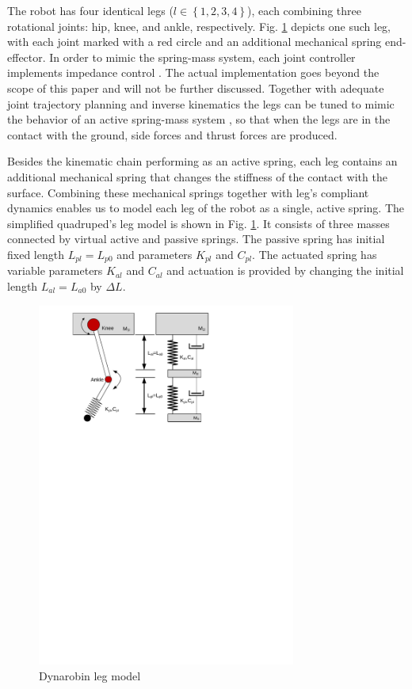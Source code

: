 

The robot has four identical legs ($l\in \left \{ 1,2,3,4 \right \}$), each combining three rotational joints: hip, knee, and ankle, respectively. Fig. \ref{fig:DynarobinLEG} depicts one such leg, with each joint marked with a red circle and an additional mechanical spring end-effector. In order to mimic the spring-mass system, each joint controller implements impedance control \cite{citeulike:2203614}. The actual implementation goes beyond the scope of this paper and will not be further discussed. Together with adequate joint trajectory planning and inverse kinematics the legs can be tuned to mimic the behavior of an active spring-mass system \cite{conf/iros/ParkP12}\cite{6171868}, so that when the legs are in the contact with the ground, side forces and thrust forces are produced.

Besides the kinematic chain performing as an active spring, each leg contains an additional mechanical spring that changes the stiffness of the contact with the surface. Combining these mechanical springs together with leg's compliant dynamics enables us to model each leg of the robot as a single, active spring. The simplified quadruped's leg model is shown in Fig. \ref{fig:DynarobinLEG}. It consists of three masses connected by virtual active and passive springs. The passive spring has initial fixed length $L_{pl}=L_{p0}$ and parameters $K_{pl}$ and $C_{pl}$.  The actuated spring has variable parameters $K_{al}$ and $C_{al}$ and actuation is provided by changing the initial length $L_{al}=L_{a0}$ by $\Delta L$.
\begin{figure}[t!]
	\centering
	\includegraphics[width=85mm]{./pictures/Dynarobin_leg.pdf}
	\caption{Dynarobin leg model}
	\label{fig:DynarobinLEG}
\end{figure}

